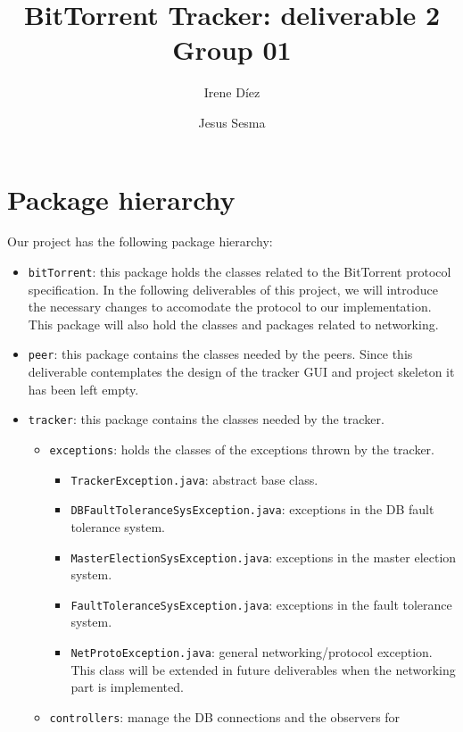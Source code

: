 \documentclass[twoside,a4paper,10pt]{article}
\title{BitTorrent Tracker: deliverable 2\\
  Group 01}
\author{Irene Díez \and Jesus Sesma}
\begin{document}
\date{}
\maketitle

\section{Package hierarchy}\label{sec:pa-hierarchy}

Our project has the following package hierarchy:

\begin{itemize}
\item \texttt{bitTorrent}: this package holds the classes related to the
  BitTorrent protocol specification. In the following deliverables of this
  project, we will introduce the necessary changes to accomodate the protocol
  to our implementation.
  This package will also hold the classes and packages related to networking.
\item \texttt{peer}: this package contains the classes needed by the peers. 
  Since this deliverable contemplates the design of the tracker GUI and
  project skeleton it has been left empty.
\item \texttt{tracker}: this package contains the classes needed by the tracker.
  \begin{itemize}
  \item \texttt{exceptions}: holds the classes of the exceptions thrown by the
    tracker.
    \begin{itemize}
    \item \texttt{TrackerException.java}: abstract base class.
    \item \texttt{DBFaultToleranceSysException.java}: exceptions in the DB
      fault tolerance system.
    \item \texttt{MasterElectionSysException.java}: exceptions in the master
      election system.
    \item \texttt{FaultToleranceSysException.java}: exceptions in the fault
      tolerance system.
    \item \texttt{NetProtoException.java}: general networking/protocol
      exception. This class will be extended in future deliverables when the
      networking part is implemented.
    \end{itemize}
  \item \texttt{controllers}: manage the DB connections and the observers for

\end{itemize}
\end{itemize}
\end{document}
